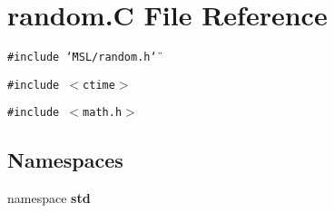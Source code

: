 \section{random.C File Reference}
\label{random_8C}
{\tt \#include \char`\"{}MSL/random.h\char`\"{}}\par
{\tt \#include $<$ctime$>$}\par
{\tt \#include $<$math.h$>$}\par
\subsection*{Namespaces}
\begin{CompactItemize}
\item 
namespace {\bf std}
\end{CompactItemize}
